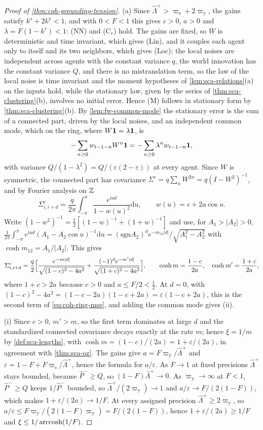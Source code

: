 \begin{proof}[Proof of \cref{thm:coh-grounding-tension}]
(a) Since $\hat\Lambda^+>\varpi_{\mathrm s}+2\varpi_{\mathrm y}$, the gains satisfy $k^s+2k^{\mathrm y}<1$, and with $0<F<1$ this gives $c>0$, $a>0$ and $\lambda=F(1-k^s)<1$: \textup{(NN)} and \textup{(C$_r$)} hold. The gains are fixed, so $W$ is deterministic and time invariant, which gives \textup{(Lin)}, and it couples each agent only to itself and its two neighbors, which gives \textup{(Loc)}; the local noises are independent across agents with the constant variance $q$, the world innovation has the constant variance $Q$, and there is no mistranslation term, so the law of the local noise is time invariant and the moment hypotheses of \cref{lem:sca-relations}(a) on the inputs hold, while the stationary law, given by the series of \cref{thm:sca-clustering}(b), involves no initial error. Hence \textup{(M)} follows in stationary form by \cref{thm:sca-clustering}(b). By \cref{lem:fw-common-mode} the stationary error is the sum of a connected part, driven by the local noises, and an independent common mode, which on the ring, where $W\mathbf{1}=\lambda\mathbf{1}$, is
\[ -\sum_{n\ge0}w_{t-1-n}W^n\mathbf{1}=-\sum_{n\ge0}\lambda^nw_{t-1-n}\mathbf{1}, \]
with variance $Q/(1-\lambda^2)=Q/(\varepsilon(2-\varepsilon))$ at every agent. Since $W$ is symmetric, the connected part has covariance $\Sigma^c=q\sum_nW^{2n}=q(I-W^2)^{-1}$, and by Fourier analysis on $\mathbb{Z}$
\[ \Sigma^c_{i,i+d}=\frac q{2\pi}\int_{-\pi}^{\pi}\frac{e^{\mathrm iud}}{1-w(u)^2}\mathrm{d}u,\qquad w(u)=c+2a\cos u. \]
Write $(1-w^2)^{-1}=\frac12[(1-w)^{-1}+(1+w)^{-1}]$ and use, for $A_1>|A_2|>0$, $\frac1{2\pi}\int_{-\pi}^{\pi}e^{\mathrm iud}(A_1-A_2\cos u)^{-1}\mathrm{d}u=(\mathrm{sgn}A_2)^de^{-m_{12}|d|}/\sqrt{A_1^2-A_2^2}$ with $\cosh m_{12}=A_1/|A_2|$. This gives
\[ \Sigma^c_{i,i+d}=\frac q2\Bigl[\frac{e^{-m|d|}}{\sqrt{(1-c)^2-4a^2}}+\frac{(-1)^de^{-m'|d|}}{\sqrt{(1+c)^2-4a^2}}\Bigr],\qquad\cosh m=\frac{1-c}{2a},\quad\cosh m'=\frac{1+c}{2a}, \]
where $1+c>2a$ because $c>0$ and $a\le F/2<\frac12$. At $d=0$, with $(1-c)^2-4a^2=(1-c-2a)(1-c+2a)=\varepsilon(1-c+2a)$, this is the second term of \eqref{eq:coh-ring-mse}, and adding the common mode gives (ii).

(i) Since $c>0$, $m'>m$, so the first term dominates at large $d$ and the standardized connected covariance decays exactly at the rate $m$; hence $\xi=1/m$ by \cref{def:sca-lengths}, with $\cosh m=(1-c)/(2a)=1+\varepsilon/(2a)$, in agreement with \cref{thm:sca-oz}. The gains give $a=F\varpi_{\mathrm y}/\hat\Lambda^+$ and $\varepsilon=1-F+F\varpi_{\mathrm s}/\hat\Lambda^+$, hence the formula for $a/\varepsilon$. As $F\to1$ at fixed precisions $\hat\Lambda^+$ stays bounded, because $\hat P^-\ge Q$, so $(1-F)\hat\Lambda^+\to0$. As $\varpi_{\mathrm y}\to\infty$ at $F<1$, $\hat P^-\ge Q$ keeps $1/\hat P^-$ bounded, so $\hat\Lambda^+/(2\varpi_{\mathrm y})\to1$ and $a/\varepsilon\to F/(2(1-F))$, which makes $1+\varepsilon/(2a)\to1/F$. At every assigned precision $\hat\Lambda^+\ge2\varpi_{\mathrm y}$, so $a/\varepsilon\le F\varpi_{\mathrm y}/(2(1-F)\varpi_{\mathrm y})=F/(2(1-F))$, hence $1+\varepsilon/(2a)\ge1/F$ and $\xi\le1/\operatorname{arccosh}(1/F)$.


\end{proof}
